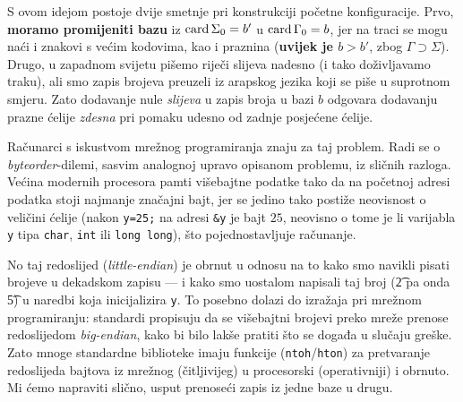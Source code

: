S ovom idejom postoje dvije smetnje pri konstrukciji početne konfiguracije. Prvo, \textbf{moramo promijeniti bazu} iz $\operatorname{card}\Sigma_0=b'$ u $\operatorname{card}\Gamma_0=b$, jer na traci se mogu naći i znakovi s većim kodovima, kao i praznina (\textbf{uvijek je $b>b'$}, zbog $\Gamma\supset\Sigma$). Drugo, u zapadnom svijetu pišemo riječi slijeva nadesno (i tako doživljavamo traku), ali smo zapis brojeva preuzeli iz arapskog jezika koji se piše u suprotnom smjeru. Zato dodavanje nule \emph{slijeva} u zapis broja u bazi $b$ odgovara dodavanju prazne ćelije \emph{zdesna} pri pomaku udesno od zadnje posjećene ćelije.

Računarci s iskustvom mrežnog programiranja znaju za taj problem. Radi se o \emph{byteorder}-dilemi, sasvim analognoj upravo opisanom problemu, iz sličnih razloga. Većina modernih procesora pamti višebajtne podatke tako da na početnoj adresi podatka stoji najmanje značajni bajt, jer se jedino tako postiže neovisnost o veličini ćelije %
(nakon \texttt{y=25;} na adresi \texttt{\&y} je bajt $25$, neovisno o tome je li varijabla \texttt y tipa \texttt{char}, \texttt{int} ili \texttt{long~long}), što pojednostavljuje računanje. %

No taj redoslijed (\emph{little-endian}) je obrnut u odnosu na to kako smo navikli pisati brojeve u dekadskom zapisu --- i kako smo uostalom napisali taj broj (\t2 pa onda \t5) u naredbi koja inicijalizira \texttt y. To posebno dolazi do izražaja pri mrežnom programiranju: standardi propisuju da se višebajtni brojevi preko mreže prenose redoslijedom \emph{big-endian}, kako bi bilo lakše pratiti što se događa u slučaju greške. Zato mnoge standardne biblioteke imaju funkcije (\texttt{ntoh}/\texttt{hton}) za pretvaranje redoslijeda bajtova iz mrežnog (čitljivijeg) u procesorski (operativniji) i obrnuto. Mi ćemo napraviti slično, usput prenoseći zapis iz jedne baze u drugu.

